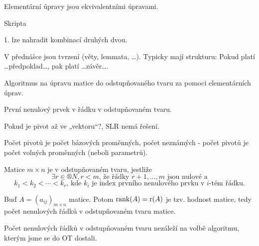 \documentclass[12pt]{article}					%
\begin{document}
    \begin{tvrzeni}
        Elementární úpravy jsou ekvivalentními úpravami.
        \begin{dukazin}
            Skripta
        \end{dukazin}
        
        \begin{poznamka}
            1. lze nahradit kombinací druhých dvou.
        \end{poznamka}
    \end{tvrzeni}

    \begin{upozorneni}
        V přednášce jsou tvrzení (věty, lemmata, …). Typicky mají strukturu: Pokud platí …předpoklad…, pak platí …závěr….
    \end{upozorneni}


    \begin{definice}
        Algoritmus na úpravu matice do odstupňovaného tvaru za pomoci elementárních úprav.
    \end{definice}

    \begin{definice}[Pivot]
        První nenulový prvek v řádku v odstupňovaném tvaru.

        Pokud je pivot až ve „vektoru“?, SLR nemá řešení. 

        Počet pivotů je počet bázových proměnných, počet neznámých - počet pivotů je počet volných proměnných (neboli parametrů).
    \end{definice}

    \begin{definice}
        Matice $m\times n$ je v odstupňovaném tvaru, jestliže
        $$ \exists r \in ®N, r<m\text{, že řádky }r+1,…,m\text{ jsou nulové a} $$
        $$ k_1 < k_2 < \cdots < k_r\text{, kde }k_i\text{ je index prvního nenulového prvku v }i\text{-tém řádku.} $$
    \end{definice}

    \begin{definice}
        Buď $A = (a_{ij})_{m\times n}$ matice. Potom $\operatorname{rank}(A) = \text{r}(A)$ je tzv. hodnost matice, tedy počet nenulových řádků v odstupňovaném tvaru matice.
    \end{definice}

    \begin{upozorneni}
        Počet nenulových řádků v odstupňovaném tvaru nezáleží na volbě algoritmu, kterým jsme se do OT dostali.
    \end{upozorneni}
\end{document}

